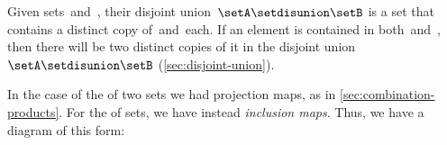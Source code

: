 %
%
%
%

Given sets~\setA and~\setB, their disjoint union~$\setA \setdisunion \setB$ is a set that contains a distinct copy of~\setA and~\setB each.
If an element is contained in both~\setA and~\setB, then there will be two distinct copies of it in the disjoint union~$\setA \setdisunion \setB$ (\cref{sec:disjoint-union}).


In the case of the  of two sets we had projection maps, as in \cref{sec:combination-products}.
For the  of sets, we have instead \emph{inclusion maps}.
Thus, we have a diagram of this form:


